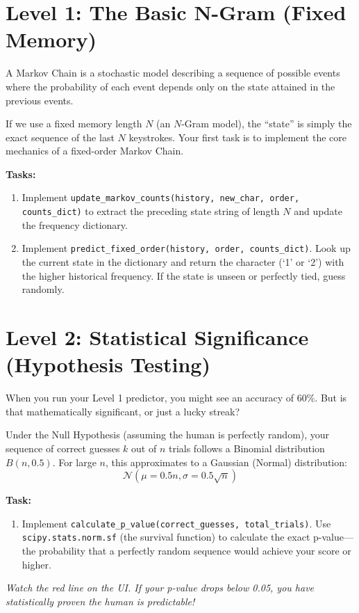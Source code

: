 \documentclass[12pt]{article}
\begin{document}
\section{Level 1: The Basic N-Gram (Fixed Memory)}
A Markov Chain is a stochastic model describing a sequence of possible events where the probability of each event depends only on the state attained in the previous events.

If we use a fixed memory length $N$ (an $N$-Gram model), the ``state'' is simply the exact sequence of the last $N$ keystrokes.
Your first task is to implement the core mechanics of a fixed-order Markov Chain.

\textbf{Tasks:}
\begin{enumerate}
    \item Implement \texttt{update\_markov\_counts(history, new\_char, order, counts\_dict)} to extract the preceding state string of length $N$ and update the frequency dictionary.
    \item Implement \texttt{predict\_fixed\_order(history, order, counts\_dict)}. Look up the current state in the dictionary and return the character (`1' or `2') with the higher historical frequency. If the state is unseen or perfectly tied, guess randomly.
\end{enumerate}

\section{Level 2: Statistical Significance (Hypothesis Testing)}
When you run your Level 1 predictor, you might see an accuracy of 60\%. But is that mathematically significant, or just a lucky streak?

Under the Null Hypothesis (assuming the human is perfectly random), your sequence of correct guesses $k$ out of $n$ trials follows a Binomial distribution $B(n, 0.5)$. For large $n$, this approximates to a Gaussian (Normal) distribution:
$$ \mathcal{N}\left(\mu = 0.5n, \sigma = 0.5\sqrt{n}\right) $$

\textbf{Task:}
\begin{enumerate}
    \item Implement \texttt{calculate\_p\_value(correct\_guesses, total\_trials)}. Use \texttt{scipy.stats.norm.sf} (the survival function) to calculate the exact p-value---the probability that a perfectly random sequence would achieve your score or higher.
\end{enumerate}
\textit{Watch the red line on the UI. If your p-value drops below 0.05, you have statistically proven the human is predictable!}
\end{document}
